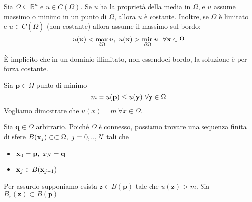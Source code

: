 \begin{theorem}
    \label{thm:principio-di-massimo-armoniche}
    Sia $\Omega \subseteq \mathbb{R}^{n}$ e $u\in C(\Omega)$. Se $u$ ha la proprietà della media in $\Omega $, e $u$ assume massimo o minimo in un punto di $\Omega $, allora $u$ è costante. Inoltre, se $\Omega $ è limitato e $u\in C(\overline{\Omega })$ (non costante) allora assume il massimo sul bordo:
    \begin{equation*}
        u(\x) < \max_{\partial \Omega } u,\ u(\x)  >\min_{\partial \Omega } u\ \ \forall \x\in \Omega
    \end{equation*}
\end{theorem}
È implicito che in un dominio illimitato, non essendoci bordo, la soluzione è per forza costante.
\begin{dimostrazione}
    Sia $\mathbf{p}\in \Omega $ punto di minimo
    \begin{equation*}
        m=u(\mathbf{p}) \leqslant u(\y) \ \forall \y\in \Omega
    \end{equation*}
    Vogliamo dimostrare che $u(x) =m\ \forall x\in \Omega $.

    Sia $\mathbf{q}\in \Omega $ arbitrario. Poiché $\Omega $ è connesso, possiamo trovare una sequenza finita di sfere $B(\x_{j}) \subset \subset \Omega,\ j=0,..,N$ tali che
    \begin{itemize}
        \item $\x_{0} =\mathbf{p},\ x_{N} =\mathbf{q}$
        \item $\x_{j} \in B(\x_{j-1})$
    \end{itemize}
    Per assurdo supponiamo esista $\mathbf{z}\in B(\mathbf{p})$ tale che $u(\mathbf{z})  >m$. Sia $B_{r}(\mathbf{z}) \subset B(\mathbf{p})$

    \begin{figure}[H]
        \centering

        \begin{tikzpicture}[x=0.75pt,y=0.75pt,yscale=-1,xscale=1]


\end{tikzpicture}
\end{figure}
\end{dimostrazione}
